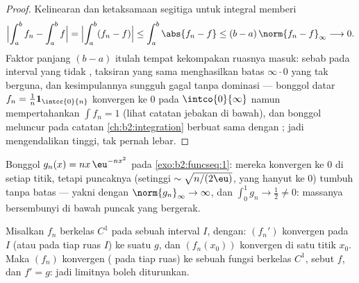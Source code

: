 \begin{proof}
Kelinearan dan ketaksamaan segitiga untuk integral memberi
\[
\Bigl|\int_a^b f_n - \int_a^b f\Bigr|
= \Bigl|\int_a^b (f_n - f)\Bigr|
\leq \int_a^b\abs{f_n - f}
\leq (b - a)\,\norm{f_n - f}_\infty \longrightarrow 0 .
\]
Faktor panjang $(b - a)$ itulah tempat kekompakan ruasnya
masuk: sebab pada interval yang tidak , taksiran yang sama
menghasilkan batas $\infty\cdot0$ yang tak berguna, dan kesimpulannya
sungguh gagal tanpa dominasi --- bonggol datar $f_n =
\frac1n\mathbf 1_{\intcc{0}{n}}$ konvergen  ke $0$ pada
$\intco{0}{\infty}$ namun mempertahankan $\int f_n = 1$ (lihat catatan
jebakan di bawah), dan bonggol meluncur pada catatan
\cref{ch:b2:integration} berbuat sama dengan ; jadi  mengendalikan tinggi, tak pernah lebar.
\end{proof}

\begin{omfigure}

{\small Bonggol $g_n(x) = nx\,\eu^{-nx^2}$ pada
\cref{exo:b2:funcseq:1}: mereka konvergen ke $0$ di setiap titik,
tetapi puncaknya (setinggi $\sim\sqrt{n/(2\eu)}$, yang hanyut ke
$0$) tumbuh tanpa batas --- yakni  dengan
$\norm{g_n}_\infty \to \infty$, dan $\int_0^1 g_n \to \frac12
\neq 0$: massanya bersembunyi di bawah puncak yang bergerak.}
\end{omfigure}

\begin{theorem}[Penurunan]\label{thm:b2:funcseq:differentiation}
Misalkan $f_n$ berkelas $C^1$ pada sebuah interval $I$, dengan: $(f_n')$
konvergen \emph{} pada $I$ (atau pada tiap ruas $I$) ke suatu
$g$, dan $(f_n(x_0))$ konvergen di satu titik $x_0$. Maka $(f_n)$
konvergen ( pada tiap ruas) ke sebuah fungsi berkelas $C^1$,
sebut $f$, dan $f' = g$: jadi limitnya boleh diturunkan.
\end{theorem}

